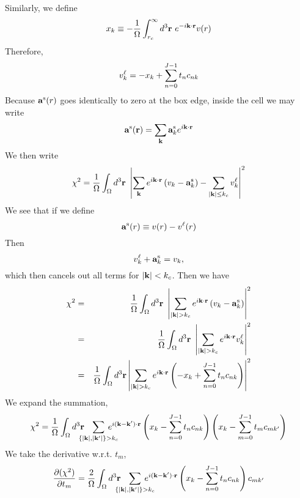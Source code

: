 Similarly, we define
\begin{equation}
x_k \equiv -\frac{1}{\Omega} \int_{r_c}^\infty d^3\vr \ e^{-i\vk\cdot\vr} v(r)
\end{equation}
Therefore,
\begin{equation}
\vl_k = -x_k + \sum_{n=0}^{J-1} t_n c_{nk} 
\end{equation}
Because $\vs(r)$ goes identically to zero at the box edge, inside the
cell we may write
\begin{equation}
\vs(\vr) = \sum_\vk \vs_k e^{i\vk \cdot \vr}
\end{equation}
We then write
\begin{equation}
\chi^2 = \frac{1}{\Omega} \int_\Omega d^3 \vr \ 
\left| \sum_\vk e^{i\vk \cdot \vr} \left(v_k - \vs_k \right)
-\sum_{|\vk| \le k_c} \vl_k \right|^2
\end{equation}
We see that if we define
\begin{equation}
\vs(r) \equiv v(r) - \vl(r)
\end{equation}
Then
\begin{equation}
\vl_k + \vs_k = v_k,
\end{equation}
which then cancels out all terms for $|\vk| < k_c$.  Then we have
\begin{eqnarray}
\chi^2 & = & \frac{1}{\Omega} \int_\Omega d^3 \vr \ 
\left|\sum_{|\vk|>k_c} e^{i\vk\cdot\vr} 
\left(v_k -\vs_k \right)\right|^2 \\
& = & \frac{1}{\Omega} \int_\Omega d^3 \vr \ 
\left|\sum_{|\vk|>k_c} e^{i\vk\cdot\vr} \vl_k \right|^2 \\ 
& = & 
\frac{1}{\Omega} \int_\Omega d^3 \vr
\left|\sum_{|\vk|>k_c} e^{i\vk\cdot\vr}\left( -x_k + \sum_{n=0}^{J-1} t_n
c_{nk}\right) \right|^2
\end{eqnarray}
We expand the summation,
\newcommand{\ns}{\negthickspace}
\begin{equation}
\chi^2 = \frac{1}{\Omega} \int_\Omega d^3 \vr \ns \ns \ns
\sum_{\{|\vk|,|\vk'|\}>k_c} \ns\ns\ns\ns\ns
 e^{i(\vk-\vk')\cdot \vr}
\left(x_k -\sum_{n=0}^{J-1} t_n c_{nk} \right)
\left(x_k -\sum_{m=0}^{J-1} t_{m} c_{mk'} \right)
\end{equation}
We take the derivative w.r.t. $t_{m}$,
\begin{equation}
\frac{\partial (\chi^2)}{\partial t_{m}} =
\frac{2}{\Omega}\int_\Omega d^3 \vr \ns \ns \ns
\sum_{\{|\vk|,|\vk'|\}>k_c} \ns\ns\ns\ns\ns
 e^{i(\vk-\vk')\cdot \vr}
\left(x_k -\sum_{n=0}^{J-1} t_n c_{nk} \right) c_{mk'}
\end{equation}
